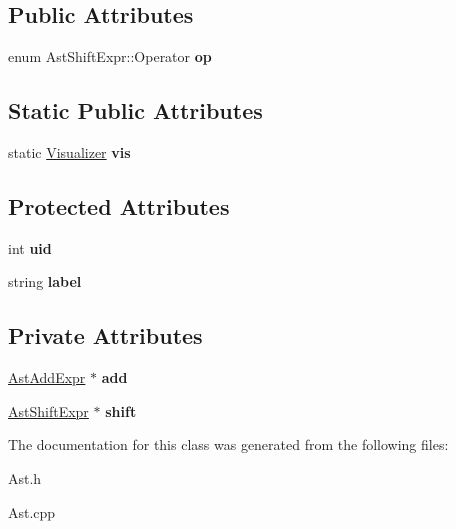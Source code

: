 \subsection*{Public Attributes}
\begin{DoxyCompactItemize}
\item 
\hypertarget{classAstShiftExpr_a637fba35ffc19fe4da9569d92ab704ea}{enum Ast\-Shift\-Expr\-::\-Operator {\bfseries op}}\label{classAstShiftExpr_a637fba35ffc19fe4da9569d92ab704ea}

\end{DoxyCompactItemize}
\subsection*{Static Public Attributes}
\begin{DoxyCompactItemize}
\item 
\hypertarget{classAST_aca9e6637209b31e03a09c0d42f29bdfa}{static \hyperlink{classVisualizer}{Visualizer} {\bfseries vis}}\label{classAST_aca9e6637209b31e03a09c0d42f29bdfa}

\end{DoxyCompactItemize}
\subsection*{Protected Attributes}
\begin{DoxyCompactItemize}
\item 
\hypertarget{classAST_a847b778f1c3dd5a19de32de432ee6e15}{int {\bfseries uid}}\label{classAST_a847b778f1c3dd5a19de32de432ee6e15}

\item 
\hypertarget{classAST_ab2e239ccc0688d2341724432ff5a1a31}{string {\bfseries label}}\label{classAST_ab2e239ccc0688d2341724432ff5a1a31}

\end{DoxyCompactItemize}
\subsection*{Private Attributes}
\begin{DoxyCompactItemize}
\item 
\hypertarget{classAstShiftExpr_ab7f53d7e78fc19e580097130d2298aa2}{\hyperlink{classAstAddExpr}{Ast\-Add\-Expr} $\ast$ {\bfseries add}}\label{classAstShiftExpr_ab7f53d7e78fc19e580097130d2298aa2}

\item 
\hypertarget{classAstShiftExpr_a8609437ab341b8c26e2aa138d3cae348}{\hyperlink{classAstShiftExpr}{Ast\-Shift\-Expr} $\ast$ {\bfseries shift}}\label{classAstShiftExpr_a8609437ab341b8c26e2aa138d3cae348}

\end{DoxyCompactItemize}


The documentation for this class was generated from the following files\-:\begin{DoxyCompactItemize}
\item 
Ast.\-h\item 
Ast.\-cpp\end{DoxyCompactItemize}
